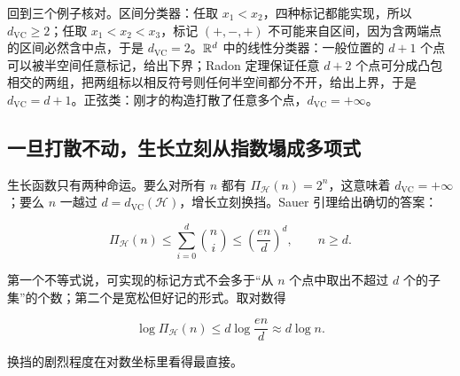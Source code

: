 回到三个例子核对。区间分类器：任取 \(x_1<x_2\)，四种标记都能实现，所以 \(d_{\mathrm{VC}}\ge 2\)；任取 \(x_1<x_2<x_3\)，标记 \((+,-,+)\) 不可能来自区间，因为含两端点的区间必然含中点，于是 \(d_{\mathrm{VC}}=2\)。\(\mathbb{R}^d\) 中的线性分类器：一般位置的 \(d+1\) 个点可以被半空间任意标记，给出下界；Radon 定理保证任意 \(d+2\) 个点可分成凸包相交的两组，把两组标以相反符号则任何半空间都分不开，给出上界，于是 \(d_{\mathrm{VC}}=d+1\)。正弦类：刚才的构造打散了任意多个点，\(d_{\mathrm{VC}}=+\infty\)。

\subsection{一旦打散不动，生长立刻从指数塌成多项式}

生长函数只有两种命运。要么对所有 \(n\) 都有 \(\Pi_{\mathcal{H}}(n)=2^n\)，这意味着 \(d_{\mathrm{VC}}=+\infty\)；要么 \(n\) 一越过 \(d=d_{\mathrm{VC}}(\mathcal{H})\)，增长立刻换挡。Sauer 引理给出确切的答案：

\[
\Pi_{\mathcal{H}}(n)
\le \sum_{i=0}^{d}\binom{n}{i}
\le \left(\frac{en}{d}\right)^{d},
\qquad n\ge d.
\]

第一个不等式说，可实现的标记方式不会多于``从 \(n\) 个点中取出不超过 \(d\) 个的子集''的个数；第二个是宽松但好记的形式。取对数得

\[
\log\Pi_{\mathcal{H}}(n) \le d\log\frac{en}{d} \approx d\log n.
\]

换挡的剧烈程度在对数坐标里看得最直接。

\begin{center}
\end{center}

